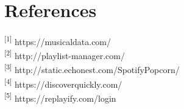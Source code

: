 \documentclass[letter, 11pt]{article}
\begin{document}
\section*{References}

\noindent
{\textsuperscript{[1]} https://musicaldata.com/} \\
{\textsuperscript{[2]} http://playlist-manager.com/} \\
{\textsuperscript{[3]} http://static.echonest.com/SpotifyPopcorn/}\\
{\textsuperscript{[4]} https://discoverquickly.com/}\\
{\textsuperscript{[5]} https://replayify.com/login}
\end{document}
